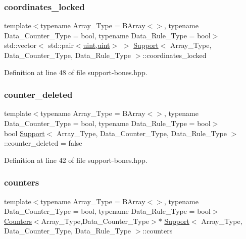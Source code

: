 \mbox{\label{class_support_ab740de5d3497a4bf51cddb256f85cd72}} 
\subsubsection{\texorpdfstring{coordinates\+\_\+locked}{coordinates\_locked}}
{\footnotesize\ttfamily template$<$typename Array\+\_\+\+Type = B\+Array$<$$>$, typename Data\+\_\+\+Counter\+\_\+\+Type = bool, typename Data\+\_\+\+Rule\+\_\+\+Type = bool$>$ \\
std\+::vector$<$ std\+::pair$<$\hyperlink{typedefs_8hpp_a91ad9478d81a7aaf2593e8d9c3d06a14}{uint},\hyperlink{typedefs_8hpp_a91ad9478d81a7aaf2593e8d9c3d06a14}{uint}$>$ $>$ \hyperlink{class_support}{Support}$<$ Array\+\_\+\+Type, Data\+\_\+\+Counter\+\_\+\+Type, Data\+\_\+\+Rule\+\_\+\+Type $>$\+::coordinates\+\_\+locked}



Definition at line 48 of file support-\/bones.\+hpp.

\mbox{\label{class_support_a518268efc16cef68aa2211089c822c03}} 
\subsubsection{\texorpdfstring{counter\+\_\+deleted}{counter\_deleted}}
{\footnotesize\ttfamily template$<$typename Array\+\_\+\+Type = B\+Array$<$$>$, typename Data\+\_\+\+Counter\+\_\+\+Type = bool, typename Data\+\_\+\+Rule\+\_\+\+Type = bool$>$ \\
bool \hyperlink{class_support}{Support}$<$ Array\+\_\+\+Type, Data\+\_\+\+Counter\+\_\+\+Type, Data\+\_\+\+Rule\+\_\+\+Type $>$\+::counter\+\_\+deleted = false}



Definition at line 42 of file support-\/bones.\+hpp.

\mbox{\label{class_support_abf25e6063ecc63fbceda7d58a8610560}} 
\subsubsection{\texorpdfstring{counters}{counters}}
{\footnotesize\ttfamily template$<$typename Array\+\_\+\+Type = B\+Array$<$$>$, typename Data\+\_\+\+Counter\+\_\+\+Type = bool, typename Data\+\_\+\+Rule\+\_\+\+Type = bool$>$ \\
\hyperlink{class_counters}{Counters}$<$Array\+\_\+\+Type,Data\+\_\+\+Counter\+\_\+\+Type$>$$\ast$ \hyperlink{class_support}{Support}$<$ Array\+\_\+\+Type, Data\+\_\+\+Counter\+\_\+\+Type, Data\+\_\+\+Rule\+\_\+\+Type $>$\+::counters}



